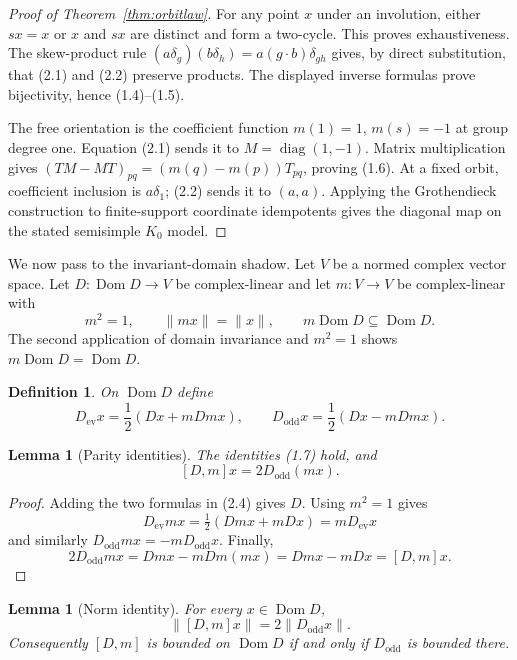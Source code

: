 \documentclass[11pt,reqno]{amsart}
\newtheorem{lemma}[theorem]{Lemma}
\newtheorem{definition}[theorem]{Definition}
\newcommand{\Dom}{\operatorname{Dom}}
\begin{document}
\begin{proof}[Proof of Theorem~\ref{thm:orbitlaw}]
For any point $x$ under an involution, either $sx=x$ or $x$ and $sx$ are distinct and form a
two-cycle.  This proves exhaustiveness.  The skew-product rule
$(a\delta_g)(b\delta_h)=a(g\cdot b)\delta_{gh}$ gives, by direct substitution, that (2.1) and
(2.2) preserve products.  The displayed inverse formulas prove bijectivity, hence (1.4)--(1.5).

The free orientation is the coefficient function $m(1)=1$, $m(s)=-1$ at group degree one.
Equation (2.1) sends it to $M=\operatorname{diag}(1,-1)$.  Matrix multiplication gives
$(TM-MT)_{pq}=(m(q)-m(p))T_{pq}$, proving (1.6).  At a fixed orbit, coefficient inclusion is
$a\delta_1$; (2.2) sends it to $(a,a)$.  Applying the Grothendieck construction to finite-support
coordinate idempotents gives the diagonal map on the stated semisimple $K_0$ model.
\end{proof}

We now pass to the invariant-domain shadow.  Let $V$ be a normed complex vector space.  Let
$D:\Dom D\to V$ be complex-linear and let $m:V\to V$ be complex-linear with
\[
 m^2=1,\qquad \|mx\|=\|x\|,\qquad m\Dom D\subseteq\Dom D. \tag{2.3}
\]
The second application of domain invariance and $m^2=1$ shows $m\Dom D=\Dom D$.

\begin{definition}
On $\Dom D$ define
\[
 D_{\mathrm{ev}}x=\frac12(Dx+mDmx),\qquad
 D_{\mathrm{odd}}x=\frac12(Dx-mDmx).                \tag{2.4}
\]
\end{definition}

\begin{lemma}[Parity identities]\label{lem:parity}
The identities \textup{(1.7)} hold, and
\[
 [D,m]x=2D_{\mathrm{odd}}(mx).                       \tag{2.5}
\]
\end{lemma}

\begin{proof}
Adding the two formulas in (2.4) gives $D$.  Using $m^2=1$ gives
\[
 D_{\mathrm{ev}}mx=\tfrac12(Dmx+mDx)=mD_{\mathrm{ev}}x
\]
and similarly $D_{\mathrm{odd}}mx=-mD_{\mathrm{odd}}x$.  Finally,
\[
 2D_{\mathrm{odd}}mx=Dmx-mDm(mx)=Dmx-mDx=[D,m]x.
\]
\end{proof}

\begin{lemma}[Norm identity]\label{lem:norm}
For every $x\in\Dom D$,
\[
              \|[D,m]x\|=2\|D_{\mathrm{odd}}x\|.
\]
Consequently $[D,m]$ is bounded on $\Dom D$ if and only if $D_{\mathrm{odd}}$ is bounded there.
\end{lemma}
\end{document}
